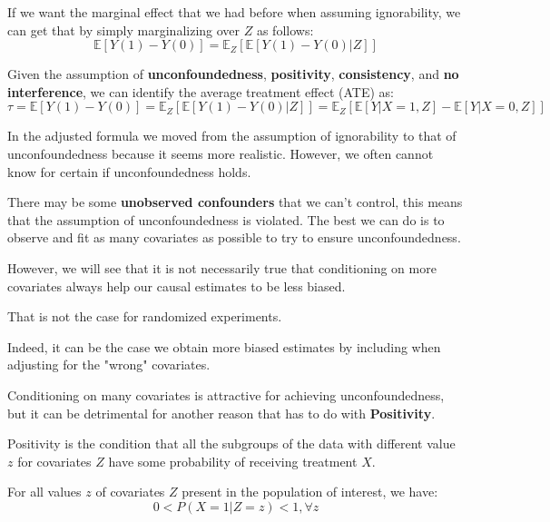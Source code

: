 If we want the marginal effect that we had before when assuming ignorability, we
can get that by simply marginalizing over $Z$ as follows:
\begin{equation}
    \mathbb{E}[Y(1) - Y(0)] = \mathbb{E}_Z[\mathbb{E}[Y(1) - Y(0) | Z]]
\end{equation}

\begin{definition}
    Given the assumption of \textbf{unconfoundedness}, \textbf{positivity},
    \textbf{consistency}, and \textbf{no interference}, we can identify the average
    treatment effect (ATE) as:
    \begin{equation}
        \tau = \mathbb{E}[Y(1) - Y(0)] = \mathbb{E}_Z[\mathbb{E}[Y(1) - Y(0) | Z]]
        = \mathbb{E}_Z[\mathbb{E}[Y|X = 1, Z] - \mathbb{E}[Y|X = 0, Z]]
    \end{equation}
\end{definition}

In the adjusted formula we moved from the assumption of ignorability to that
of unconfoundedness because it seems more realistic. However, we often cannot
know for certain if unconfoundedness holds.

There may be some \textbf{unobserved confounders} that we can't control, this means
that the assumption of unconfoundedness is violated. The best we can do is to
observe and fit as many covariates as possible to try to ensure unconfoundedness.

However, we will see that it is not necessarily true that conditioning on more
covariates always help our causal estimates to be less biased.

\begin{note}
    That is not the case for randomized experiments.
\end{note}

Indeed, it can be the case we obtain more biased estimates by including when
adjusting for the "wrong" covariates.

Conditioning on many covariates is attractive for achieving unconfoundedness, but
it can be detrimental for another reason that has to do with \textbf{Positivity}.

\begin{definition}
    Positivity is the condition that all the subgroups of the data with different
    value $z$ for covariates $Z$ have some probability of receiving treatment $X$.

    For all values $z$ of covariates $Z$ present in the population of interest,
    we have:
    \begin{equation}
        0 < P(X = 1 | Z = z) < 1, \forall z
    \end{equation}
\end{definition}

